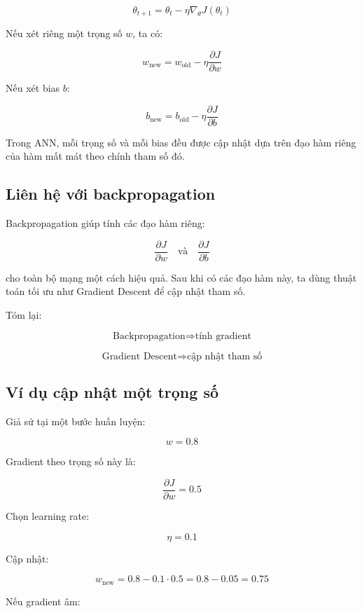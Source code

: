\[
    \theta_{t+1}
    =
    \theta_t
    -
    \eta \nabla_{\theta}J(\theta_t)
\]

Nếu xét riêng một trọng số $w$, ta có:

\[
    w_{\text{new}}
    =
    w_{\text{old}}
    -
    \eta
    \frac{\partial J}{\partial w}
\]

Nếu xét bias $b$:

\[
    b_{\text{new}}
    =
    b_{\text{old}}
    -
    \eta
    \frac{\partial J}{\partial b}
\]

\begin{ghinho}
Trong ANN, mỗi trọng số và mỗi bias đều được cập nhật dựa trên đạo hàm riêng của hàm mất mát theo chính tham số đó.
\end{ghinho}

\subsection{Liên hệ với backpropagation}

Backpropagation giúp tính các đạo hàm riêng:

\[
    \frac{\partial J}{\partial w}
    \quad \text{và} \quad
    \frac{\partial J}{\partial b}
\]

cho toàn bộ mạng một cách hiệu quả. Sau khi có các đạo hàm này, ta dùng thuật toán tối ưu như Gradient Descent để cập nhật tham số.

Tóm lại:

\[
    \text{Backpropagation} \Rightarrow \text{tính gradient}
\]

\[
    \text{Gradient Descent} \Rightarrow \text{cập nhật tham số}
\]

\subsection{Ví dụ cập nhật một trọng số}

Giả sử tại một bước huấn luyện:

\[
    w = 0.8
\]

Gradient theo trọng số này là:

\[
    \frac{\partial J}{\partial w}=0.5
\]

Chọn learning rate:

\[
    \eta=0.1
\]

Cập nhật:

\[
    w_{\text{new}}
    =
    0.8 - 0.1 \cdot 0.5
    =
    0.8 - 0.05
    =
    0.75
\]

Nếu gradient âm:

